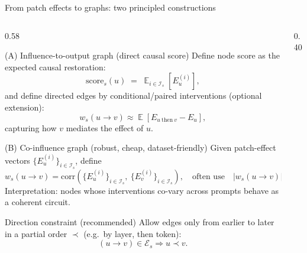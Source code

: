 \documentclass[aspectratio=169,xcolor={dvipsnames}]{beamer}
\DeclareMathOperator{\Exp}{\mathbb{E}}
\begin{document}
\begin{frame}[shrink=38]{From patch effects to graphs: two principled constructions}
\small
\begin{columns}[T,onlytextwidth]
\begin{column}{0.58\textwidth}
\begin{block}{(A) Influence-to-output graph (direct causal score)}
Define node score as the expected causal restoration:
\[
\mathrm{score}_s(u) \;=\; \Exp_{i\in\mathcal{I}_s}\!\left[E_u^{(i)}\right],
\]
and define directed edges by conditional/paired interventions (optional extension):
\[
w_s(u\to v)\approx \Exp\!\left[ E_{u\ \text{then}\ v} - E_{u} \right],
\]
capturing how $v$ mediates the effect of $u$.
\end{block}

\begin{block}{(B) Co-influence graph (robust, cheap, dataset-friendly)}
Given patch-effect vectors $\{E_u^{(i)}\}_{i\in\mathcal{I}_s}$, define
\[
w_s(u\to v)
=
\mathrm{corr}\!\left(\{E_u^{(i)}\}_{i\in\mathcal{I}_s},\ \{E_v^{(i)}\}_{i\in\mathcal{I}_s}\right),
\quad\text{often use}\quad |w_s(u\to v)|.
\]
Interpretation: nodes whose interventions co-vary across prompts behave as a coherent circuit.
\end{block}

\begin{block}{Direction constraint (recommended)}
Allow edges only from earlier to later in a partial order $\prec$ (e.g.\ by layer, then token):
\[
(u\to v)\in\mathcal{E}_s \Rightarrow u\prec v.
\]
\end{block}
\end{column}

\begin{column}{0.40\textwidth}

\newcommand{\panelScale}{0.88}   %
\newcommand{\xA}{11mm}           %
\newcommand{\yA}{12mm}            %
\newcommand{\xB}{14mm}           %
\newcommand{\yB}{12mm}            %
\newcommand{\stackSep}{3mm}      %
\newcommand{\nodeSize}{4.2mm}    %


\end{column}
\end{columns}
\end{frame}
\end{document}
